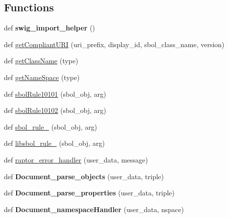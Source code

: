 \subsection*{Functions}
\begin{DoxyCompactItemize}
\item 
def {\bfseries swig\+\_\+import\+\_\+helper} ()\hypertarget{namespacesbol_1_1libsbol_aba4bf995971dd04c25e5fcd87eb3cc97}{}\label{namespacesbol_1_1libsbol_aba4bf995971dd04c25e5fcd87eb3cc97}

\item 
def \hyperlink{namespacesbol_1_1libsbol_ace7aaea051aeba9c5774d58be8bbaaec}{get\+Compliant\+U\+RI} (uri\+\_\+prefix, display\+\_\+id, sbol\+\_\+class\+\_\+name, version)
\item 
def \hyperlink{namespacesbol_1_1libsbol_aeeb8cfa6243d12babc3848a253f7ff75}{get\+Class\+Name} (type)
\item 
def \hyperlink{namespacesbol_1_1libsbol_a424b38fa08c701b24d5c3ac18f4ef514}{get\+Name\+Space} (type)
\item 
def \hyperlink{namespacesbol_1_1libsbol_a340ad9b7757b2c028c59a902531df35b}{sbol\+Rule10101} (sbol\+\_\+obj, arg)
\item 
def \hyperlink{namespacesbol_1_1libsbol_a89405465955ab1a4394fb7f5a98aacf4}{sbol\+Rule10102} (sbol\+\_\+obj, arg)
\item 
def \hyperlink{namespacesbol_1_1libsbol_affa39c27b7e8f2b36b10e90c6e9ea2ed}{sbol\+\_\+rule\+\_} (sbol\+\_\+obj, arg)
\item 
def \hyperlink{namespacesbol_1_1libsbol_a53a84aae1a8f917ba611aad46ad2b41b}{libsbol\+\_\+rule\+\_} (sbol\+\_\+obj, arg)
\item 
def \hyperlink{namespacesbol_1_1libsbol_a4ef193089e4b436f9d624fa2a5a31471}{raptor\+\_\+error\+\_\+handler} (user\+\_\+data, message)
\item 
def {\bfseries Document\+\_\+parse\+\_\+objects} (user\+\_\+data, triple)\hypertarget{namespacesbol_1_1libsbol_a58b2dced03f03496cd0f2140ccefde71}{}\label{namespacesbol_1_1libsbol_a58b2dced03f03496cd0f2140ccefde71}

\item 
def {\bfseries Document\+\_\+parse\+\_\+properties} (user\+\_\+data, triple)\hypertarget{namespacesbol_1_1libsbol_a5f6cf2fe400dbf69df7774013acfb219}{}\label{namespacesbol_1_1libsbol_a5f6cf2fe400dbf69df7774013acfb219}

\item 
def {\bfseries Document\+\_\+namespace\+Handler} (user\+\_\+data, nspace)\hypertarget{namespacesbol_1_1libsbol_aa808feb1803ec331a6dc8d5b988c3748}{}\label{namespacesbol_1_1libsbol_aa808feb1803ec331a6dc8d5b988c3748}


\end{DoxyCompactItemize}
